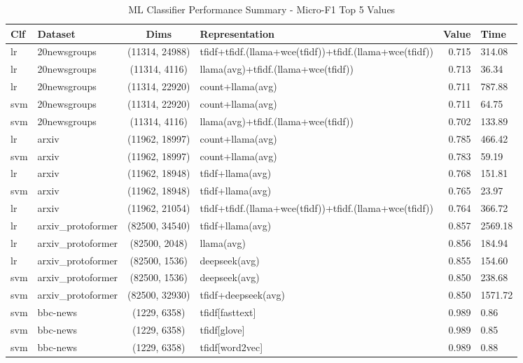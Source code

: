 \documentclass[final]{clv2025}
\begin{document}
\begin{table}[h!]
\centering
\scriptsize
\caption{ML Classifier Performance Summary - Micro-F1 Top 5 Values}
\label{tab:ml_classifier_summary_micro_f1}
\begin{tabular}{@{}p{.7cm} p{1.8cm} c >{\raggedright\arraybackslash}p{5.8cm} r p{1.0cm}@{}}
\toprule
\textbf{Clf} & \textbf{Dataset} & \textbf{Dims} & \textbf{Representation} & \textbf{Value} & \textbf{Time} \\
\midrule
lr & 20newsgroups & (11314, 24988) & tfidf+tfidf.(llama+wce(tfidf))+tfidf.(llama+wce(tfidf)) & 0.715 & 314.08 \\
lr & 20newsgroups & (11314, 4116) & llama(avg)+tfidf.(llama+wce(tfidf)) & 0.713 & 36.34 \\
lr & 20newsgroups & (11314, 22920) & count+llama(avg) & 0.711 & 787.88 \\
svm & 20newsgroups & (11314, 22920) & count+llama(avg) & 0.711 & 64.75 \\
svm & 20newsgroups & (11314, 4116) & llama(avg)+tfidf.(llama+wce(tfidf)) & 0.702 & 133.89 \\
\midrule
lr & arxiv & (11962, 18997) & count+llama(avg) & 0.785 & 466.42 \\
svm & arxiv & (11962, 18997) & count+llama(avg) & 0.783 & 59.19 \\
lr & arxiv & (11962, 18948) & tfidf+llama(avg) & 0.768 & 151.81 \\
svm & arxiv & (11962, 18948) & tfidf+llama(avg) & 0.765 & 23.97 \\
lr & arxiv & (11962, 21054) & tfidf+tfidf.(llama+wce(tfidf))+tfidf.(llama+wce(tfidf)) & 0.764 & 366.72 \\
\midrule
lr & arxiv\_protoformer & (82500, 34540) & tfidf+llama(avg) & 0.857 & 2569.18 \\
lr & arxiv\_protoformer & (82500, 2048) & llama(avg) & 0.856 & 184.94 \\
lr & arxiv\_protoformer & (82500, 1536) & deepseek(avg) & 0.855 & 154.60 \\
svm & arxiv\_protoformer & (82500, 1536) & deepseek(avg) & 0.850 & 238.68 \\
svm & arxiv\_protoformer & (82500, 32930) & tfidf+deepseek(avg) & 0.850 & 1571.72 \\
\midrule
svm & bbc-news & (1229, 6358) & tfidf[fasttext] & 0.989 & 0.86 \\
svm & bbc-news & (1229, 6358) & tfidf[glove] & 0.989 & 0.85 \\
svm & bbc-news & (1229, 6358) & tfidf[word2vec] & 0.989 & 0.88 \\

\end{tabular}
\end{table}
\end{document}
